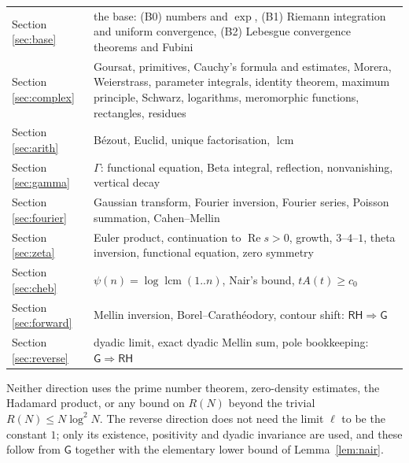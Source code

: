 \documentclass[11pt]{article}
\theoremstyle{definition}
\newcommand{\re}{\operatorname{Re}}
\newcommand{\lcm}{\operatorname{lcm}}
\newcommand{\RH}{\mathsf{RH}}
\newcommand{\GR}{\mathsf{G}}
\begin{document}
\begin{center}
\begin{tabular}{p{}p{}}
Section \ref{sec:base} & the base: (B0) numbers and $\exp$, (B1) Riemann integration and uniform convergence, (B2) Lebesgue convergence theorems and Fubini \\
Section \ref{sec:complex} & Goursat, primitives, Cauchy's formula and estimates, Morera, Weierstrass, parameter integrals, identity theorem, maximum principle, Schwarz, logarithms, meromorphic functions, rectangles, residues \\
Section \ref{sec:arith} & B\'ezout, Euclid, unique factorisation, $\lcm$ \\
Section \ref{sec:gamma} & $\Gamma$: functional equation, Beta integral, reflection, nonvanishing, vertical decay \\
Section \ref{sec:fourier} & Gaussian transform, Fourier inversion, Fourier series, Poisson summation, Cahen--Mellin \\
Section \ref{sec:zeta} & Euler product, continuation to $\re s>0$, growth, $3$--$4$--$1$, theta inversion, functional equation, zero symmetry \\
Section \ref{sec:cheb} & $\psi(n)=\log\lcm(1..n)$, Nair's bound, $tA(t)\ge c_0$ \\
Section \ref{sec:forward} & Mellin inversion, Borel--Carath\'eodory, contour shift: $\RH\Rightarrow\GR$ \\
Section \ref{sec:reverse} & dyadic limit, exact dyadic Mellin sum, pole bookkeeping: $\GR\Rightarrow\RH$
\end{tabular}
\end{center}

Neither direction uses the prime number theorem, zero-density estimates, the Hadamard product, or any bound on $R(N)$ beyond the trivial $R(N)\le N\log^{2}N$.
The reverse direction does not need the limit $\ell$ to be the constant $1$; only its existence, positivity and dyadic invariance are used, and these follow from $\GR$ together with the elementary lower bound of Lemma~\ref{lem:nair}.
\end{document}
